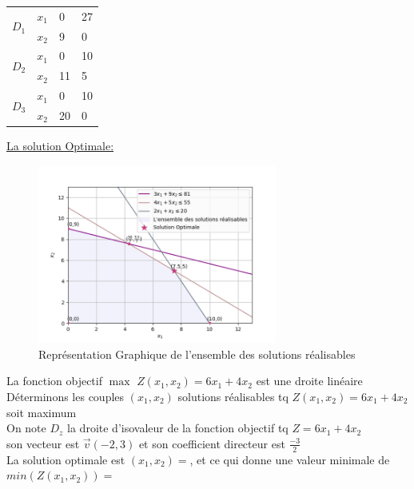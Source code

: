 \documentclass[]{book}
\begin{document}
\begin{center}
    \begin{tabular}{ | m{0.5cm} | m{0.5cm}| m{1cm} | m{1cm} | } 
      \hline
        \multirow{2}{4em}{$D_1$} & $x_1$  & 0 & 27 \\
        \cline{2-4} & $x_2$  & 9 & 0 \\
        \hline
        
        \multirow{2}{4em}{$D_2$} & $x_1$ & 0 & 10 \\
        \cline{2-4} & $x_2$ & 11 & 5 \\
        \hline
        
        \multirow{2}{4em}{$D_3$} & $x_1$ & 0 & 10 \\
        \cline{2-4} & $x_2$ & 20 & 0\\
        \hline
    \end{tabular}
\end{center}

\underline{La solution Optimale:}
\begin{figure}[H]
    \centering
    \includegraphics[width=0.7\textwidth]{Figures/figure_06.png}
    \caption{Représentation Graphique de l'ensemble des solutions réalisables}
    \label{fig:placeholder}
\end{figure}

La fonction objectif $\max$ $Z(x_1,x_2) = 6x_1 + 4x_2$ est une droite linéaire\\
Déterminons les couples $(x_1, x_2)$ solutions réalisables tq $Z(x_1,x_2) = 6x_1 + 4x_2$ soit maximum\\
On note $D_z$ la droite d'isovaleur de la fonction objectif tq $Z = 6x_1 + 4x_2$\\
son vecteur est $\Vec{v}(-2,3)$ et son coefficient directeur est $\frac{-3}{2}$\\
La solution optimale est $(x_1,x_2)=$, et ce qui donne une valeur minimale de $min(Z(x_1,x_2)) =  $
\end{document}
